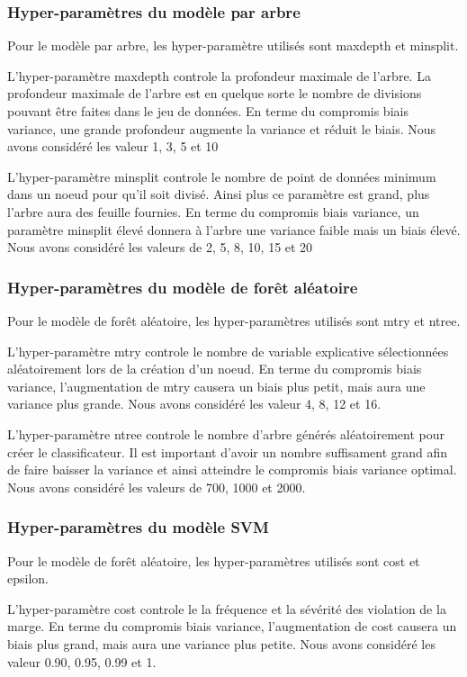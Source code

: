 \subsubsection{Hyper-paramètres du modèle par arbre}
Pour le modèle par arbre, les hyper-paramètre utilisés sont maxdepth et minsplit. 

L'hyper-paramètre maxdepth controle la profondeur maximale de l'arbre. La profondeur maximale de l'arbre est en quelque sorte le nombre de divisions pouvant être faites dans le jeu de données. En terme du compromis biais variance, une grande profondeur augmente la variance et réduit le biais. Nous avons considéré les valeur 1, 3, 5 et 10

L'hyper-paramètre minsplit controle le nombre de point de données minimum dans un noeud pour qu'il soit divisé. Ainsi plus ce paramètre est grand, plus l'arbre aura des feuille fournies. En terme du compromis biais variance, un paramètre minsplit élevé donnera à l'arbre une variance faible mais un biais élevé. Nous avons considéré les valeurs de 2, 5, 8, 10, 15 et 20


\subsubsection{Hyper-paramètres du modèle de forêt aléatoire}
Pour le modèle de forêt aléatoire, les hyper-paramètres utilisés sont mtry et ntree. 

L'hyper-paramètre mtry controle le nombre de variable explicative sélectionnées aléatoirement lors de la création d'un noeud.  En terme du compromis biais variance, l'augmentation de mtry causera un biais plus petit, mais aura une variance plus grande.  Nous avons considéré les valeur 4, 8, 12 et 16.

L'hyper-paramètre ntree controle le nombre d'arbre générés aléatoirement pour créer le classificateur. Il est important d'avoir un nombre suffisament grand afin de faire baisser la variance et ainsi atteindre le compromis biais variance optimal. Nous avons considéré les valeurs de 700, 1000 et 2000. 



\subsubsection{Hyper-paramètres du modèle SVM}
Pour le modèle de forêt aléatoire, les hyper-paramètres utilisés sont cost et epsilon. 

L'hyper-paramètre cost controle le la fréquence et la sévérité des violation de la marge.  En terme du compromis biais variance, l'augmentation de cost causera un biais plus grand, mais aura une variance plus petite. Nous avons considéré les valeur 0.90, 0.95, 0.99 et 1.


